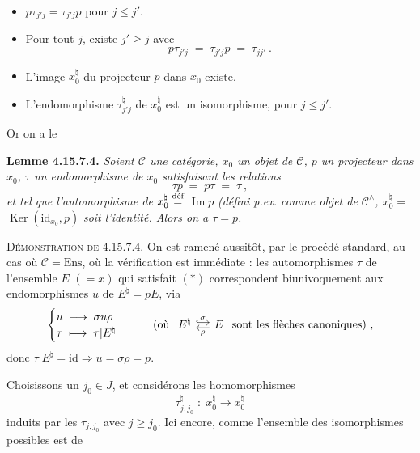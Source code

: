 \documentclass[11pt]{article}
\newcommand{\printedpage}[1]{\marginpar{\footnotesize p.~#1}}
\newcommand{\msp}[1]{\marginpar{\footnotesize [#1]}}
\newcommand{\cC}{\mathcal{C}}
\newcommand{\id}{\mathrm{id}}
\newcommand{\Img}{\operatorname{Im}}
\newcommand{\Ker}{\operatorname{Ker}}
\newcommand{\defeq}{\overset{\text{\upshape déf}}{=}}
\begin{document}
\begin{itemize}
\item[1°)] $p\tau_{j'j} = \tau_{j'j}p$ pour $j \leqslant j'$.
\item[2°)] Pour tout $j$, existe $j' \geqslant j$ avec
\[
p\tau_{j'j} \;=\; \tau_{j'j}p \;=\; \tau_{jj'}\ . %
\]
\item[3°)] L'image $x_0^\natural$ du projecteur $p$ dans $x_0$ existe.
\item[4°)] L'endomorphisme $\tau^\natural_{j'j}$ de $x_0^\natural$ est un isomorphisme, pour $j \leqslant j'$.
\end{itemize}
\msp{page 445}
Or on a le

\textbf{Lemme 4.15.7.4.} \textit{Soient $\cC$ une catégorie, $x_0$ un objet de $\cC$, $p$ un projecteur dans $x_0$, $\tau$ un endomorphisme de $x_0$ satisfaisant les relations}
\[
\tau p \;=\; p\tau \;=\; \tau\ , \tag*{$(*)$}
\]
\printedpage{171}
\textit{et tel que l'automorphisme de $x_0^\natural \defeq$} $\Img p$ \textit{(défini p.ex. comme objet de $\cC^\wedge$, $x_0^\natural =$} $\Ker(\id_{x_0},p)$ %
\textit{soit l'identité. Alors on a $\tau = p$.}

\textsc{Démonstration de} 4.15.7.4. On est ramené aussitôt, par le procédé standard, au cas où $\cC = \mathrm{Ens}$, où la vérification est immédiate : les automorphismes $\tau$ de l'ensemble $E$ $(= x)$ qui satisfait $(*)$ correspondent biunivoquement aux endomorphismes $u$ de $E^\natural = pE$, via
\[
\begin{cases}
u \;\longmapsto\; \sigma u \rho \\
\tau \;\longmapsto\; \tau|E^\natural
\end{cases}
\qquad
\text{(où }
\begin{tikzcd}[column sep=small]
E^\natural \arrow[r, hook, shift left, "\sigma"] & E \arrow[l, shift left, "\rho"]
\end{tikzcd}
\text{ sont les flèches canoniques)}\ ,
\]
donc $\tau|E^\natural = \id \Longrightarrow u = \sigma\rho = p$.

Choisissons un $j_0 \in J$, et considérons les homomorphismes
\[
\tau^\natural_{j,j_0} \;:\; x_0^\natural \longrightarrow x_0^\natural
\]
induits par les $\tau_{j,j_0}$ avec $j \geqslant j_0$. Ici encore, comme l'ensemble des isomorphismes possibles est de
\end{document}
